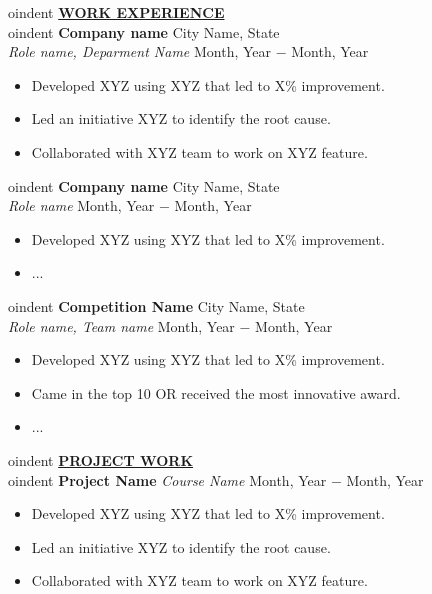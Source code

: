 \documentclass{article}
\begin{document}
oindent \textbf{\underline{WORK EXPERIENCE}} \\

oindent \textbf{Company name} \hfill City Name, State \\
\textit{Role name, Deparment Name} \hfill Month, Year $-$ Month, Year
\begin{itemize}[noitemsep,nolistsep,leftmargin=*]
\item {Developed XYZ using XYZ that led to X\% improvement.}
\item {Led an initiative XYZ to identify the root cause.}
\item {Collaborated with XYZ team to work on XYZ feature. \\}
\end{itemize}


oindent \textbf{Company name} \hfill City Name, State \\
\textit{Role name} \hfill Month, Year $-$ Month, Year
\begin{itemize}[noitemsep,nolistsep,leftmargin=*]
\item {Developed XYZ using XYZ that led to X\% improvement.}
\item {... \\}
\end{itemize}


oindent \textbf{Competition Name} \hfill City Name, State \\
\textit{Role name, Team name} \hfill Month, Year $-$ Month, Year
\begin{itemize}[noitemsep,nolistsep,leftmargin=*]
\item {Developed XYZ using XYZ that led to X\% improvement.}
\item{Came in the top 10 OR received the most innovative award.}
\item {... \\}
\end{itemize}

%
%

oindent \textbf{\underline{PROJECT WORK}} \\

oindent \textbf{Project Name} \textit{Course Name} \hfill  Month, Year $-$ Month, Year
\begin{itemize}[noitemsep,nolistsep,leftmargin=*]
\item {Developed XYZ using XYZ that led to X\% improvement.}
\item {Led an initiative XYZ to identify the root cause.}
\item {Collaborated with XYZ team to work on XYZ feature. \\}
\end{itemize}
\end{document}
